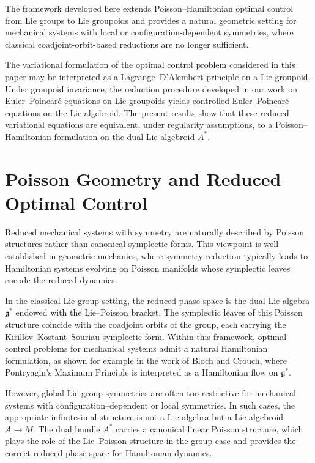 \documentclass{article}
\begin{document}
The framework developed here extends Poisson--Hamiltonian optimal control from Lie groups to Lie groupoids and provides a natural geometric setting for mechanical systems with local or configuration-dependent symmetries, where classical coadjoint-orbit-based reductions are no longer sufficient.

The variational formulation of the optimal control problem considered in this paper may be interpreted as a Lagrange--D'Alembert principle on a Lie groupoid.
Under groupoid invariance, the reduction procedure developed in our work on Euler--Poincar\'e equations on Lie groupoids yields controlled Euler--Poincar\'e equations on the Lie algebroid.
The present results show that these reduced variational equations are equivalent, under regularity assumptions, to a Poisson--Hamiltonian formulation on the dual Lie algebroid $A^*$.

\section{Poisson Geometry and Reduced Optimal Control}

Reduced mechanical systems with symmetry are naturally described by Poisson structures rather than canonical symplectic forms.  
This viewpoint is well established in geometric mechanics, where symmetry reduction typically leads to Hamiltonian systems evolving on Poisson manifolds whose symplectic leaves encode the reduced dynamics.

In the classical Lie group setting, the reduced phase space is the dual Lie algebra $\mathfrak g^*$ endowed with the Lie--Poisson bracket.  
The symplectic leaves of this Poisson structure coincide with the coadjoint orbits of the group, each carrying the Kirillov--Kostant--Souriau symplectic form.  
Within this framework, optimal control problems for mechanical systems admit a natural Hamiltonian formulation, as shown for example in the work of Bloch and Crouch, where Pontryagin's Maximum Principle is interpreted as a Hamiltonian flow on $\mathfrak g^*$.

However, global Lie group symmetries are often too restrictive for mechanical systems with configuration--dependent or local symmetries.  
In such cases, the appropriate infinitesimal structure is not a Lie algebra but a Lie algebroid $A \to M$.  
The dual bundle $A^*$ carries a canonical linear Poisson structure, which plays the role of the Lie--Poisson structure in the group case and provides the correct reduced phase space for Hamiltonian dynamics.
\end{document}
